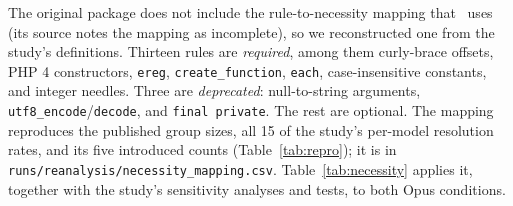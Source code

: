 \documentclass[11pt]{article}
\newcommand{\code}[1]{\texttt{#1}}
\begin{document}
The original package does not include the rule-to-necessity mapping that~\cite{mahmud2026modernization} uses (its source notes the mapping as incomplete), so we reconstructed one from the study's definitions.
Thirteen rules are \emph{required}, among them curly-brace offsets, PHP 4 constructors, \code{ereg}, \code{create\_function}, \code{each}, case-insensitive constants, and integer needles.
Three are \emph{deprecated}: null-to-string arguments, \code{utf8\_encode}/\code{decode}, and \code{final private}.
The rest are optional.
The mapping reproduces the published group sizes, all 15 of the study's per-model resolution rates, and its five introduced counts (Table~\ref{tab:repro}); it is in \code{runs/reanalysis/necessity\_mapping.csv}.
Table~\ref{tab:necessity} applies it, together with the study's sensitivity analyses and tests, to both Opus conditions.
\end{document}
